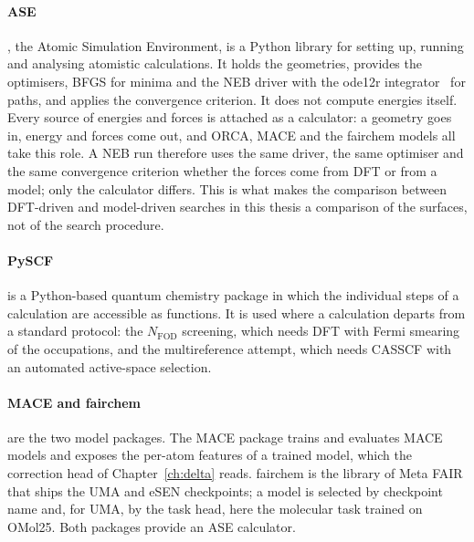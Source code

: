 \paragraph{ASE}, the Atomic Simulation Environment, is a Python library
for setting up, running and analysing atomistic calculations. It holds
the geometries, provides the optimisers, BFGS for minima and the NEB
driver with the ode12r integrator~\cite{makri2019preconditioning} for
paths, and applies the convergence criterion. It does not compute
energies itself. Every source of energies and forces is attached as a
calculator: a geometry goes in, energy and forces come out, and ORCA,
MACE and the fairchem models all take this role. A NEB run therefore uses
the same driver, the same optimiser and the same convergence criterion
whether the forces come from DFT or from a model; only the calculator
differs. This is what makes the comparison between DFT-driven and
model-driven searches in this thesis a comparison of the surfaces, not
of the search procedure.

\paragraph{PySCF} is a Python-based quantum chemistry package in which
the individual steps of a calculation are accessible as functions. It is
used where a calculation departs from a standard protocol: the
$N_\text{FOD}$ screening, which needs DFT with Fermi smearing of the
occupations, and the multireference attempt, which needs CASSCF with an
automated active-space selection.

\paragraph{MACE and fairchem} are the two model packages. The MACE
package trains and evaluates MACE models and exposes the per-atom
features of a trained model, which the correction head of
Chapter~\ref{ch:delta} reads. fairchem is the library of Meta FAIR that
ships the UMA and eSEN checkpoints; a model is selected by checkpoint
name and, for UMA, by the task head, here the molecular task trained on
OMol25. Both packages provide an ASE calculator.
